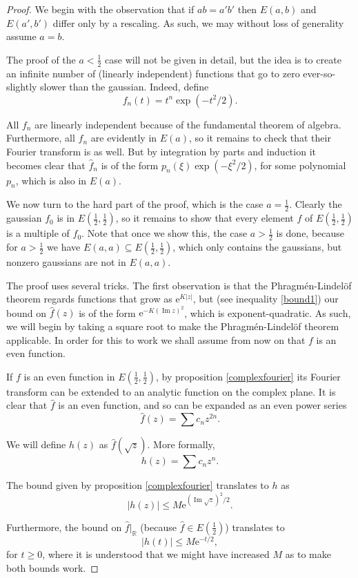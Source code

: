 \documentclass{amsart}
\newcommand{\R}{\mathbb{R}}
\newcommand{\e}{\mathrm{e}}
\DeclareMathOperator{\im}{Im}
\begin{document}
\begin{proof}
We begin with the observation that if $ab = a' b'$ then $E(a,b)$ and $E(a', b')$ differ only by a rescaling. As such, we may without loss of generality assume $a = b$.

The proof of the $a < \frac12$ case will not be given in detail, but the idea is to create an infinite number of (linearly independent) functions that go to zero ever-so-slightly slower than the gaussian. Indeed, define
\[f_n(t) = t^n \exp(-t^2/2).\]

All $f_n$ are linearly independent because of the fundamental theorem of algebra. Furthermore, all $f_n$ are evidently in $E(a)$, so it remains to check that their Fourier transform is as well. But by integration by parts and induction it becomes clear that $\hat f_n$ is of the form $p_n(\xi) \exp(-\xi^2 / 2)$, for some polynomial $p_n$, which is also in $E(a)$.

We now turn to the hard part of the proof, which is the case $a = \frac12$. Clearly the gaussian $f_0$ is in $E(\frac12, \frac12)$, so it remains to show that every element $f$ of $E(\frac12,\frac12)$ is a multiple of $f_0$. Note that once we show this, the case $a > \frac12$ is done, because for $a>\frac12$ we have $E(a,a) \subseteq E(\frac12,\frac12)$, which only contains the gaussians, but nonzero gaussians are not in $E(a,a)$.

The proof uses several tricks. The first observation is that the Phragmén-Lindelöf theorem regards functions that grow as $\e^{K \lvert z \rvert}$, but (see inequality \eqref{bound1}) our bound on $\hat f(z)$ is of the form $\e^{-K (\im z)^2}$, which is exponent-quadratic. As such, we will begin by taking a square root to make the Phragmén-Lindelöf theorem applicable. In order for this to work we shall assume from now on that $f$ is an even function.

If $f$ is an even function in $E(\frac12, \frac12)$, by proposition \ref{complexfourier} its Fourier transform can be extended to an analytic function on the complex plane. It is clear that $\hat f$ is an even function, and so can be expanded as an even power series
\[\hat f(z) = \sum c_n z^{2n}.\]

We will define $h(z)$ as $\hat f(\sqrt{z})$. More formally,
\[h(z) = \sum c_n z^n.\]

The bound given by proposition \ref{complexfourier} translates to $h$ as
\[\lvert h(z) \rvert \leq M \e^{(\im \sqrt{z})^2 / 2}.\]

Furthermore, the bound on $\hat f |_\R$ (because $\hat f \in E(\frac12)$) translates to
\[\lvert h(t) \rvert \leq M \e^{- t / 2},\]
for $t \geq 0$, where it is understood that we might have increased $M$ as to make both bounds work.


\end{proof}
\end{document}
